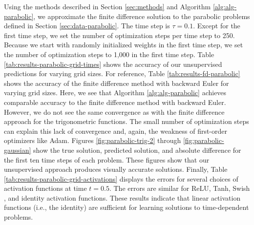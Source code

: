 \documentclass[preprint,12pt]{elsarticle}
\begin{document}
Using the methods described in Section \ref{sec:methods} and Algorithm \ref{alg:alg-parabolic}, we approximate the finite difference solution to the parabolic problems defined in Section \ref{sec:data-parabolic}. The time step is $\tau = 0.1$. Except for the first time step, we set the number of optimization steps per time step to 250. Because we start with randomly initialized weights in the first time step, we set the number of optimization steps to 1,000 in the first time step. Table \ref{tab:results-parabolic-grid-times} shows the accuracy of our unsupervised predictions for varying grid sizes. For reference, Table \ref{tab:results-fd-parabolic} shows the accuracy of the finite difference method with backward Euler for varying grid sizes. Here, we see that Algorithm \ref{alg:alg-parabolic} achieves comparable accuracy to the finite difference method with backward Euler. However, we do not see the same convergence as with the finite difference approach for the trigonometric functions. The small number of optimization steps can explain this lack of convergence and, again, the weakness of first-order optimizers like Adam. Figures \ref{fig:parabolic-trig-2} through \ref{fig:parabolic-gaussian} show the true solution, predicted solution, and absolute difference for the first ten time steps of each problem. These figures show that our unsupervised approach produces visually accurate solutions. Finally, Table \ref{tab:results-parabolic-grid-activations} displays the errors for several choices of activation functions at time $t=0.5$. The errors are similar for ReLU, Tanh, Swish \cite{ramachandran2017searching}, and identity activation functions. These results indicate that linear activation functions (i.e., the identity) are sufficient for learning solutions to time-dependent problems. 
\end{document}
